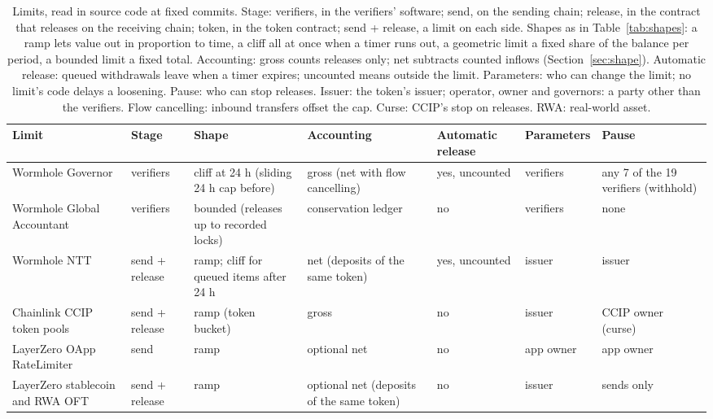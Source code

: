 \begin{table}[t]
\centering
\caption{Limits, read in source code at fixed commits. Stage: verifiers, in the verifiers' software; send, on the sending chain; release, in the contract that releases on the receiving chain; token, in the token contract; send + release, a limit on each side. Shapes as in Table~\ref{tab:shapes}: a ramp lets value out in proportion to time, a cliff all at once when a timer runs out, a geometric limit a fixed share of the balance per period, a bounded limit a fixed total. Accounting: gross counts releases only; net subtracts counted inflows (Section~\ref{sec:shape}). Automatic release: queued withdrawals leave when a timer expires; uncounted means outside the limit. Parameters: who can change the limit; no limit's code delays a loosening. Pause: who can stop releases. Issuer: the token's issuer; operator, owner and governors: a party other than the verifiers. Flow cancelling: inbound transfers offset the cap. Curse: CCIP's stop on releases. RWA: real-world asset.}
\label{tab:rules}
\scriptsize
\setlength{\tabcolsep}{3pt}
\renewcommand{\arraystretch}{1.05}
\begin{tabular}{@{}>{\raggedright\arraybackslash}p{2.95cm} >{\raggedright\arraybackslash}p{1.2cm} >{\raggedright\arraybackslash}p{3.55cm} >{\raggedright\arraybackslash}p{2.95cm} >{\raggedright\arraybackslash}p{1.95cm} >{\raggedright\arraybackslash}p{1.9cm} >{\raggedright\arraybackslash}p{2.0cm}@{}}
\toprule
Limit & Stage & Shape & Accounting & Automatic release & Parameters & Pause \\
\midrule
Wormhole Governor & verifiers & cliff at 24 h (sliding 24 h cap before) & gross (net with flow cancelling) & yes, uncounted & verifiers & any 7 of the 19 verifiers (withhold) \\
Wormhole Global Accountant & verifiers & bounded (releases up to recorded locks) & conservation ledger & no & verifiers & none \\
Wormhole NTT & send + release & ramp; cliff for queued items after 24 h & net (deposits of the same token) & yes, uncounted & issuer & issuer \\
Chainlink CCIP token pools & send + release & ramp (token bucket) & gross & no & issuer & CCIP owner (curse) \\
LayerZero OApp RateLimiter & send & ramp & optional net & no & app owner & app owner \\
LayerZero stablecoin and RWA OFT & send + release & ramp & optional net (deposits of the same token) & no & issuer & sends only \\

\end{tabular}
\end{table}
